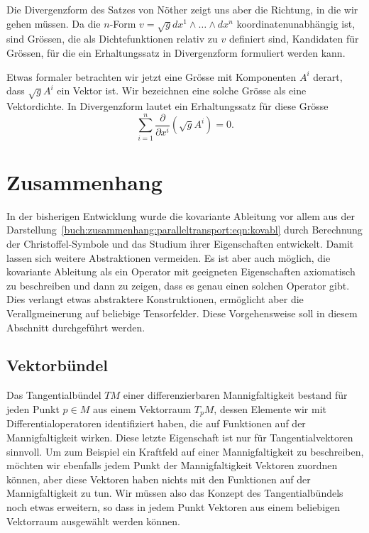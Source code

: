 Die Divergenzform des Satzes von Nöther zeigt uns aber die Richtung,
in die wir gehen müssen.
Da die $n$-Form $v=\sqrt{g} dx^1\wedge \dots\wedge dx^n$
koordinatenunabhängig ist, sind Grössen, die als Dichtefunktionen
relativ zu $v$ definiert sind, Kandidaten für Grössen, für die
ein Erhaltungssatz in Divergenzform formuliert werden kann.

Etwas formaler betrachten wir jetzt eine Grösse mit Komponenten $A^i$
derart, dass $\sqrt{g}A^i$ ein Vektor ist.
Wir bezeichnen eine solche Grösse als eine Vektordichte.
In Divergenzform lautet ein Erhaltungssatz für diese Grösse
\[
\sum_{i=1}^n \frac{\partial}{\partial x^i} (\sqrt{g}A^i)
=
0.
\]

%
%
\section{Zusammenhang
\label{buch:zusammenhang:section:zusammenhang}}
In der bisherigen Entwicklung wurde die kovariante Ableitung vor allem
aus der Darstellung~\eqref{buch:zusammenhang:paralleltransport:eqn:kovabl}
durch Berechnung der Christoffel-Symbole und das Studium ihrer
Eigenschaften entwickelt.
Damit lassen sich weitere Abstraktionen vermeiden.
Es ist aber auch möglich, die kovariante Ableitung als ein Operator
mit geeigneten Eigenschaften axiomatisch zu beschreiben und dann zu
zeigen, dass es genau einen solchen Operator gibt.
Dies verlangt etwas abstraktere Konstruktionen, ermöglicht aber
die Verallgmeinerung auf beliebige Tensorfelder.
Diese Vorgehensweise soll in diesem Abschnitt durchgeführt werden.

\subsection{Vektorbündel}
Das Tangentialbündel $TM$ einer differenzierbaren Mannigfaltigkeit
bestand für jeden Punkt $p\in M$ aus einem Vektorraum $T_pM$, dessen
Elemente wir mit Differentialoperatoren identifiziert haben, die
auf Funktionen auf der Mannigfaltigkeit wirken.
Diese letzte Eigenschaft ist nur für Tangentialvektoren sinnvoll.
Um zum Beispiel ein Kraftfeld auf einer Mannigfaltigkeit zu beschreiben,
möchten wir ebenfalls jedem Punkt der Mannigfaltigkeit Vektoren
zuordnen können, aber diese Vektoren haben nichts mit den Funktionen
auf der Mannigfaltigkeit zu tun.
Wir müssen also das Konzept des Tangentialbündels noch etwas
erweitern, so dass in jedem Punkt Vektoren aus einem beliebigen
Vektorraum ausgewählt werden können.


